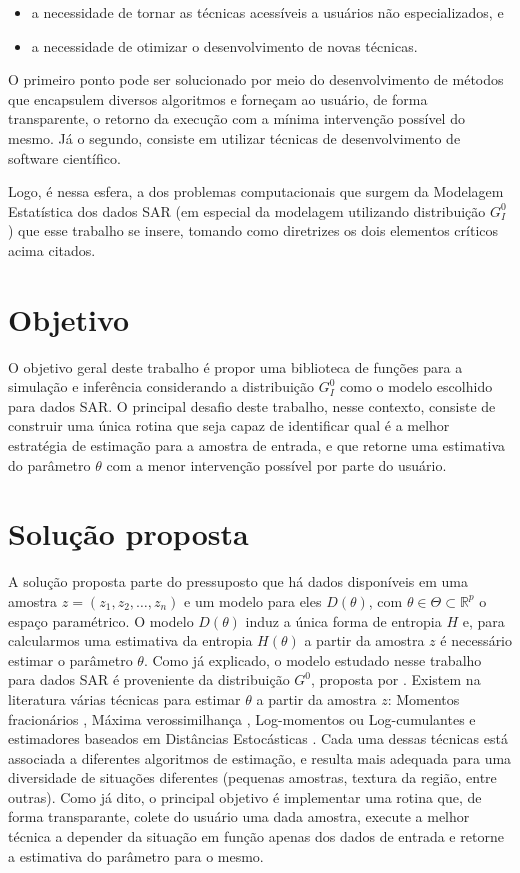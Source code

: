 \begin{itemize}
\item a necessidade de tornar as técnicas acessíveis a usuários não especializados, e
\item a necessidade de otimizar o desenvolvimento de novas técnicas.
\end{itemize}

O primeiro ponto pode ser solucionado por meio do desenvolvimento de métodos que encapsulem diversos algoritmos e forneçam ao usuário, de forma transparente, o retorno da execução com a mínima intervenção possível do mesmo. Já o segundo, consiste em utilizar técnicas de desenvolvimento de software científico.

Logo, é nessa esfera, a dos problemas computacionais que surgem da Modelagem Estatística dos dados SAR (em especial da modelagem utilizando distribuição $G_I^0$) que esse trabalho se insere, tomando como diretrizes os dois elementos críticos acima citados.

\section{Objetivo}

O objetivo geral deste trabalho é propor uma biblioteca de funções para a simulação e inferência considerando a distribuição $G_I^{0}$ como o modelo escolhido para dados SAR. O principal desafio deste trabalho, nesse contexto, consiste de construir uma única rotina que seja capaz de identificar qual é a melhor estratégia de estimação para a amostra de entrada, e que retorne uma estimativa do parâmetro $\theta$ com a menor intervenção possível por parte do usuário.

\section{Solução proposta}

A solução proposta parte do pressuposto que há dados disponíveis em uma amostra $z = (z_1, z_2, \dots, z_n)$ e um modelo para eles $D(\theta)$, com $\theta \in \Theta \subset \mathbb{R}^{p}$ o espaço paramétrico. O modelo $D(\theta)$ induz a única forma de entropia $H$ e, para calcularmos uma estimativa da entropia $H(\theta)$ a partir da amostra $z$ é necessário estimar o parâmetro $\theta$. Como já explicado, o modelo estudado nesse trabalho para dados SAR é proveniente da distribuição $G^0$, proposta por \citet{Clutter1997}. Existem na literatura várias técnicas para estimar $\theta$ a partir da amostra $z$: Momentos fracionários \citep{Mejail2002}, Máxima verossimilhança \citep{FreryMinute2004}, Log-momentos ou Log-cumulantes \citep{krylov2013} \citep{nicolas2002} e estimadores baseados em Distâncias Estocásticas \citep{Cassetti2013} \citep{FreryStochasticDistances2015}. Cada uma dessas técnicas está associada a diferentes algoritmos de estimação, e resulta mais adequada para uma diversidade de situações diferentes (pequenas amostras, textura da região, entre outras). Como já dito, o principal objetivo é implementar uma rotina que, de forma transparante, colete do usuário uma dada amostra, execute a melhor técnica a depender da situação em função apenas dos dados de entrada e retorne a estimativa do parâmetro para o mesmo.


